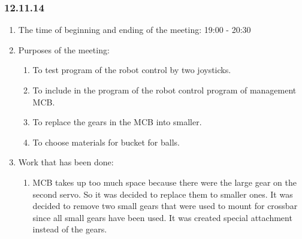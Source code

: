 
\subsubsection{12.11.14} 

\begin{enumerate} 
	\item The time of beginning and ending of the meeting:
	19:00 - 20:30
	\item Purposes of the meeting:
	\begin{enumerate}
		\item To test program of the robot control by two joysticks.
		
		\item To include in the program of the robot control program of management MCB.
		
		\item To replace the gears in the MCB into smaller.
		
		\item To choose materials for bucket for balls.
		
	\end{enumerate}
	
	\item Work that has been done:
	\begin{enumerate}
		\item MCB takes up too much space because there were the large gear on the second servo. So it was decided to replace them to smaller ones. It was decided to remove two small gears that were used to mount for crossbar since all small gears have been used. It was created special attachment instead of the gears.
		

\end{enumerate}
\end{enumerate}
